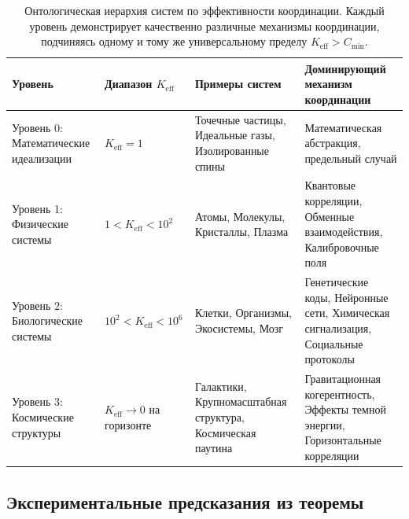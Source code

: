 \documentclass[11pt,a4paper]{article}
\begin{document}
	\begin{table}[htbp]
		\centering
		\small
		\begin{tabular}{|p{}|p{}|p{}|p{}|}
			\hline
			\textbf{Уровень} & \textbf{Диапазон $K_{\mathrm{eff}}$} & \textbf{Примеры систем} & \textbf{Доминирующий механизм координации} \\
			\hline
			Уровень 0: Математические идеализации & $K_{\mathrm{eff}} = 1$ & Точечные частицы, Идеальные газы, Изолированные спины & Математическая абстракция, предельный случай \\
			\hline
			Уровень 1: Физические системы & $1 < K_{\mathrm{eff}} < 10^2$ & Атомы, Молекулы, Кристаллы, Плазма & Квантовые корреляции, Обменные взаимодействия, Калибровочные поля \\
			\hline
			Уровень 2: Биологические системы & $10^2 < K_{\mathrm{eff}} < 10^6$ & Клетки, Организмы, Экосистемы, Мозг & Генетические коды, Нейронные сети, Химическая сигнализация, Социальные протоколы \\
			\hline
			Уровень 3: Космические структуры & $K_{\mathrm{eff}} \to 0$ на горизонте & Галактики, Крупномасштабная структура, Космическая паутина & Гравитационная когерентность, Эффекты темной энергии, Горизонтальные корреляции \\
			\hline
		\end{tabular}
		\caption{Онтологическая иерархия систем по эффективности координации. Каждый уровень демонстрирует качественно различные механизмы координации, подчиняясь одному и тому же универсальному пределу $K_{\mathrm{eff}} > C_{\min}$.}
		\label{tab:ontology-hierarchy}
	\end{table}
	
	\subsection{Экспериментальные предсказания из теоремы}
	
\end{document}
